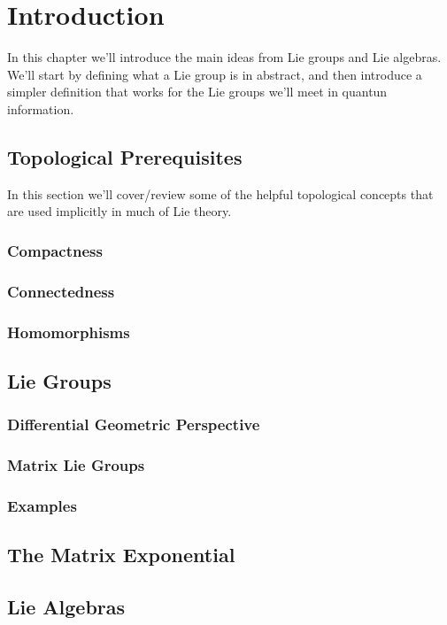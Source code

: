 \chapter{Introduction}\label{ch:introduction}

In this chapter we'll introduce the main ideas from Lie groups and Lie
algebras. We'll start by defining what a Lie group is in abstract, and then
introduce a simpler definition that works for the Lie groups we'll meet in
quantun information.

\section{Topological Prerequisites}
In this section we'll cover/review some of the helpful topological
concepts that are used implicitly in much of Lie theory.


\subsection{Compactness}

\subsection{Connectedness}

\subsection{Homomorphisms}

\section{Lie Groups}

\subsection{Differential Geometric Perspective}

\subsection{Matrix Lie Groups}

\subsection{Examples}

\section{The Matrix Exponential}

\section{Lie Algebras}

